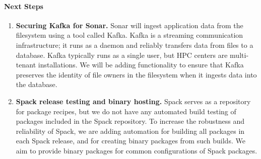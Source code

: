 \paragraph{Next Steps}
\begin{enumerate}

    \item {\bf Securing Kafka for Sonar.}  Sonar will ingest application
    data from the filesystem using a tool called Kafka. Kafka is a
    streaming communication infrastructure; it runs as a daemon and
    reliably transfers data from files to a database.  Kafka typically
    runs as a single user, but HPC centers are multi-tenant
    installations.  We will be adding functionality to ensure that Kafka
    preserves the identity of file owners in the filesystem when it
    ingests data into the database.

    \item {\bf Spack release testing and binary hosting.} Spack serves as
    a repository for package recipes, but we do not have any automated
    build testing of packages included in the Spack repository.  To
    increase the robustness and reliability of Spack, we are adding
    automation for building all packages in each Spack release, and for
    creating binary packages from such builds. We aim to provide binary
    packages for common configurations of Spack packages.
\end{enumerate}
